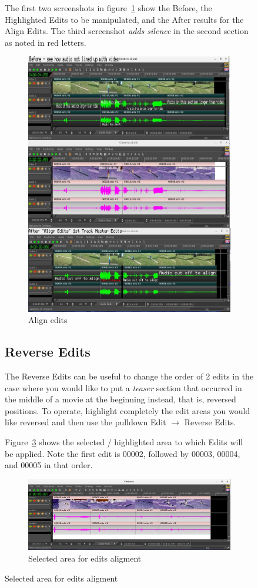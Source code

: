 \begin{figure}
The first two screenshots in figure~\ref{fig:align} show the Before, the Highlighted Edits to be manipulated, and the After results for the Align Edits. The third screenshot \textit{adds silence} in the second section as noted in red letters.
\begin{figure}[htpb]
    \centering
    \includegraphics[width=0.8\linewidth]{images/align.png}
    \caption{Align edits}
    \label{fig:align}
\end{figure}

\subsection{Reverse Edits}%
\label{sub:reverse_edits}

The Reverse Edits can be useful to change the order of 2 edits in the case where you would like to put a \textit{teaser} section that occurred in the middle of a movie at the beginning instead, that is, reversed positions.  To operate, highlight completely the edit areas you would like reversed and then use the pulldown Edit $\rightarrow$ Reverse Edits.

Figure~\ref{fig:reverse01} shows the selected / highlighted area to which Edits will be applied.  Note the first edit is 00002, followed by 00003, 00004, and 00005 in that order.
\begin{figure}[htpb]
    \centering
    \includegraphics[width=0.8\linewidth]{images/reverse01.png}
    \caption{Selected area for edits aligment}
    \label{fig:reverse01}
\end{figure}


\end{figure}
